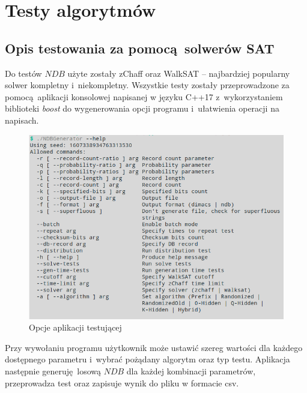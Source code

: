 \chapter{Testy algorytmów}
\section{Opis testowania za pomocą solwerów SAT}


Do testów $NDB$ użyte zostały zChaff oraz WalkSAT -- najbardziej popularny solwer kompletny i~niekompletny.
Wszystkie testy zostały przeprowadzone za pomocą aplikacji konsolowej napisanej w języku C++17 z~wykorzystaniem
biblioteki \textit{boost} do wygenerowania opcji programu i~ułatwienia operacji na napisach.

\begin{figure}[h]
    \includegraphics[width=15cm]{img/NDBGeneratorHelp.png}
    \centering
    \caption{Opcje aplikacji testującej}
    \label{img:NDBGenHelp}
\end{figure}

Przy wywołaniu programu użytkownik może ustawić szereg wartości dla każdego dostępnego parametru i~wybrać pożądany algorytm oraz typ testu.
Aplikacja następnie generuję losową $NDB$ dla każdej kombinacji parametrów, przeprowadza test oraz zapisuje wynik do pliku w formacie csv.

